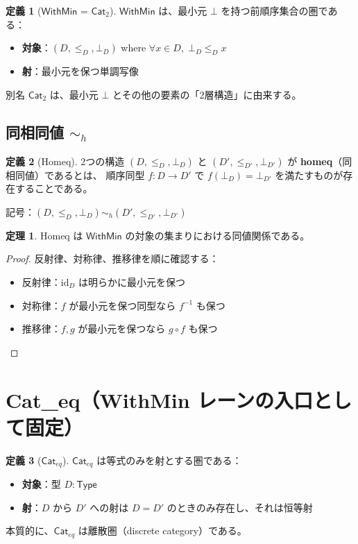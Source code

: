 \documentclass[a4paper,12pt]{ltjsarticle}
\theoremstyle{definition}
\newtheorem{definition}{定義}[section]
\newtheorem{theorem}{定理}[section]
\begin{document}
\begin{definition}[$\mathsf{WithMin}$ = $\mathsf{Cat}_2$]
$\mathsf{WithMin}$ は、最小元 $\bot$ を持つ前順序集合の圏である：
\begin{itemize}
  \item \textbf{対象}：$(D, \le_D, \bot_D)$ where $\forall x \in D,\; \bot_D \le_D x$
  \item \textbf{射}：最小元を保つ単調写像
\end{itemize}

別名 $\mathsf{Cat}_2$ は、最小元 $\bot$ とその他の要素の「2層構造」に由来する。
\end{definition}

\subsection{同相同値 $\sim_h$}

\begin{definition}[Homeq]
2つの構造 $(D, \le_D, \bot_D)$ と $(D', \le_{D'}, \bot_{D'})$ が
\textbf{homeq}（同相同値）であるとは、
順序同型 $f : D \to D'$ で $f(\bot_D) = \bot_{D'}$ を満たすものが存在することである。

記号：$(D, \le_D, \bot_D) \sim_h (D', \le_{D'}, \bot_{D'})$
\end{definition}

\begin{theorem}
Homeq は $\mathsf{WithMin}$ の対象の集まりにおける同値関係である。
\end{theorem}

\begin{proof}
反射律、対称律、推移律を順に確認する：
\begin{itemize}
  \item 反射律：$\mathrm{id}_D$ は明らかに最小元を保つ
  \item 対称律：$f$ が最小元を保つ同型なら $f^{-1}$ も保つ
  \item 推移律：$f, g$ が最小元を保つなら $g \circ f$ も保つ
\end{itemize}
\end{proof}


\section{Cat\_eq（WithMin レーンの入口として固定）}

\begin{definition}[$\mathsf{Cat}_{eq}$]
$\mathsf{Cat}_{eq}$ は等式のみを射とする圏である：
\begin{itemize}
  \item \textbf{対象}：型 $D : \mathsf{Type}$
  \item \textbf{射}：$D$ から $D'$ への射は $D = D'$ のときのみ存在し、それは恒等射
\end{itemize}

本質的に、$\mathsf{Cat}_{eq}$ は離散圏（discrete category）である。
\end{definition}
\end{document}
